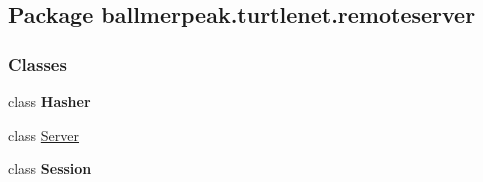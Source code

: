 \hypertarget{namespaceballmerpeak_1_1turtlenet_1_1remoteserver}{\subsection{Package ballmerpeak.\-turtlenet.\-remoteserver}
\label{namespaceballmerpeak_1_1turtlenet_1_1remoteserver}
}
\subsubsection*{Classes}
\begin{DoxyCompactItemize}
\item 
class {\bfseries Hasher}
\item 
class \hyperlink{classballmerpeak_1_1turtlenet_1_1remoteserver_1_1Server}{Server}
\item 
class {\bfseries Session}
\end{DoxyCompactItemize}
